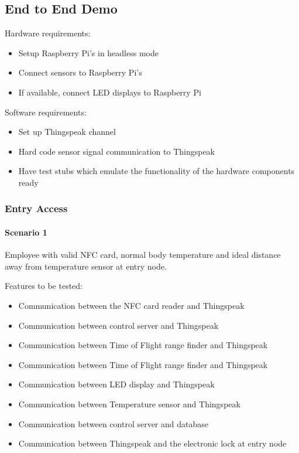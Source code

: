 \subsection{End to End Demo}

\noindent
Hardware requirements:
\begin{itemize}
    \item Setup Raspberry Pi's in headless mode 
    \item Connect sensors to Raspberry Pi's
    \item If available, connect LED displays to Raspberry Pi
\end{itemize}

\noindent
Software requirements:
\begin{itemize}
    \item Set up Thingspeak channel 
    \item Hard code sensor signal communication to Thingspeak 
    \item Have test stubs which emulate the functionality of the hardware
          components ready
\end{itemize}

\subsubsection*{Entry Access}

\paragraph{Scenario 1}
Employee with valid NFC card, normal body temperature and ideal distance away
from temperature sensor at entry node.

\noindent
Features to be tested:
\begin{itemize}
    \item Communication between the NFC card reader and Thingspeak 
    \item Communication between control server and Thingspeak
    \item Communication between Time of Flight range finder and Thingspeak 
    \item Communication between Time of Flight range finder and Thingspeak 
    \item Communication between LED display and Thingspeak 
    \item Communication between Temperature sensor and Thingspeak 
    \item Communication between control server and database
    \item Communication between Thingspeak and the electronic lock at entry node
\end{itemize}

